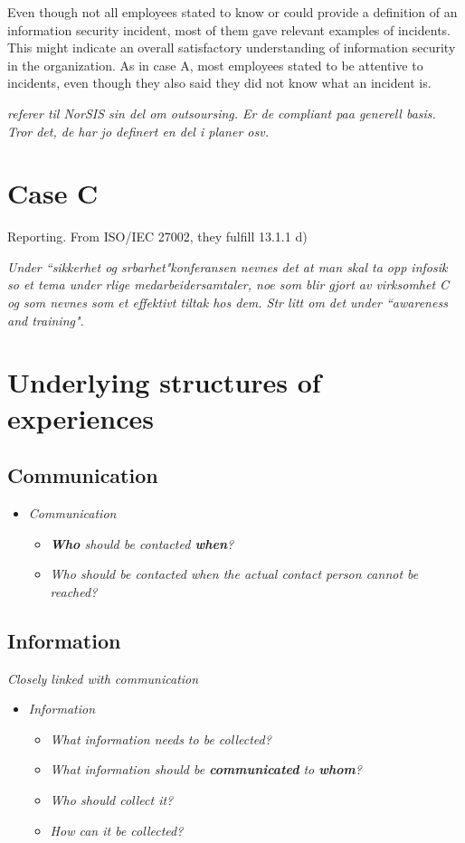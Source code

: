 Even though not all employees stated to know or could provide a definition of an information security incident, most of them gave relevant examples of incidents. This might indicate an overall satisfactory understanding of information security in the organization. As in case A, most employees stated to be attentive to incidents, even though they also said they did not know what an incident is. 

\textit{referer til NorSIS sin del om outsoursing. Er de compliant paa generell basis. Tror det, de har jo definert en del i planer osv.}

\section{Case C}

Reporting. From ISO/IEC 27002, they fulfill 13.1.1 d)

\textit{Under ``sikkerhet og srbarhet"konferansen nevnes det at man skal ta opp infosik so et tema under rlige medarbeidersamtaler, noe som blir gjort av virksomhet C og som nevnes som et effektivt tiltak hos dem. Str litt om det under ``awareness and training".}

\section{Underlying structures of experiences}
\subsection{Communication}
\begin{itemize}
\item \textit{Communication}
\begin{itemize}
\item \textit{\textbf{Who} should be contacted \textbf{when}?}
\item \textit{Who should be contacted when the actual contact person cannot be reached?}
\end{itemize}
\end{itemize}

\subsection{Information}
\textit{Closely linked with communication}

\begin{itemize}
\item \textit{Information}
\begin{itemize}
\item \textit{What information needs to be collected?}
\item \textit{What information should be \textbf{communicated} to \textbf{whom}?}
\item \textit{Who should collect it?}
\item \textit{How can it be collected?}
\end{itemize}
\end{itemize}

